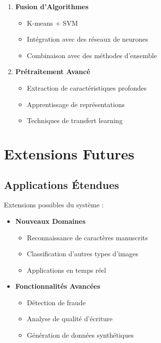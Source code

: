 \begin{enumerate}
    \item \textbf{Fusion d'Algorithmes}
    \begin{itemize}
        \item K-means + SVM
        \item Intégration avec des réseaux de neurones
        \item Combinaison avec des méthodes d'ensemble
    \end{itemize}

    \item \textbf{Prétraitement Avancé}
    \begin{itemize}
        \item Extraction de caractéristiques profondes
        \item Apprentissage de représentations
        \item Techniques de transfert learning
    \end{itemize}
\end{enumerate}

\section{Extensions Futures}

\subsection{Applications Étendues}
Extensions possibles du système :

\begin{itemize}
    \item \textbf{Nouveaux Domaines}
    \begin{itemize}
        \item Reconnaissance de caractères manuscrits
        \item Classification d'autres types d'images
        \item Applications en temps réel
    \end{itemize}

    \item \textbf{Fonctionnalités Avancées}
    \begin{itemize}
        \item Détection de fraude
        \item Analyse de qualité d'écriture
        \item Génération de données synthétiques
    \end{itemize}
\end{itemize}

